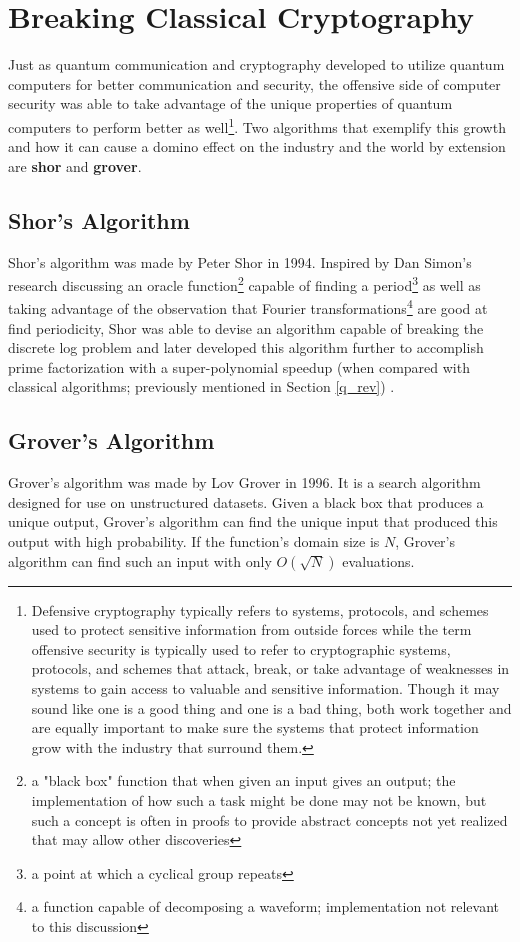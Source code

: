 \graphicspath{{Images/}}

\section{Breaking Classical Cryptography} \label{shor_grover}
Just as quantum communication and cryptography developed to utilize quantum computers for better communication and security, the offensive side of computer security was able to take advantage of the unique properties of quantum computers to perform better as well\footnote{Defensive cryptography typically refers to systems, protocols, and schemes used to protect sensitive information from outside forces while the term offensive security is typically used to refer to cryptographic systems, protocols, and schemes that attack, break, or take advantage of weaknesses in systems to gain access to valuable and sensitive information. Though it may sound like one is a good thing and one is a bad thing, both work together and are equally important to make sure the systems that protect information grow with the industry that surround them.}. Two algorithms that exemplify this growth and how it can cause a domino effect on the industry and the world by extension are \textbf{\gls{shor}} and \textbf{\gls{grover}}.

    \subsection{Shor's Algorithm}
    Shor's algorithm was made by Peter Shor in 1994. Inspired by Dan Simon's research discussing an oracle function\footnote{a "black box" function that when given an input gives an output; the implementation of how such a task might be done may not be known, but such a concept is often in proofs to provide abstract concepts not yet realized that may allow other discoveries} capable of finding a period\footnote{a point at which a cyclical group repeats\label{period}} as well as taking advantage of the observation that Fourier transformations\footnote{a function capable of decomposing a waveform; implementation not relevant to this discussion} are good at find periodicity, Shor was able to devise an algorithm capable of breaking the discrete log problem and later developed this algorithm further to accomplish prime factorization with a super-polynomial speedup (when compared with classical algorithms; previously mentioned in Section \ref{q_rev}) \cite{shor}. 
    
    \subsection{Grover's Algorithm}
    Grover's algorithm was made by Lov Grover in 1996. It is a search algorithm designed for use on unstructured datasets. Given a black box that produces a unique output, Grover's algorithm can find the unique input that produced this output with high probability. If the function's domain size is $N$, Grover's algorithm can find such an input with only $O(\sqrt{N})$ evaluations.

